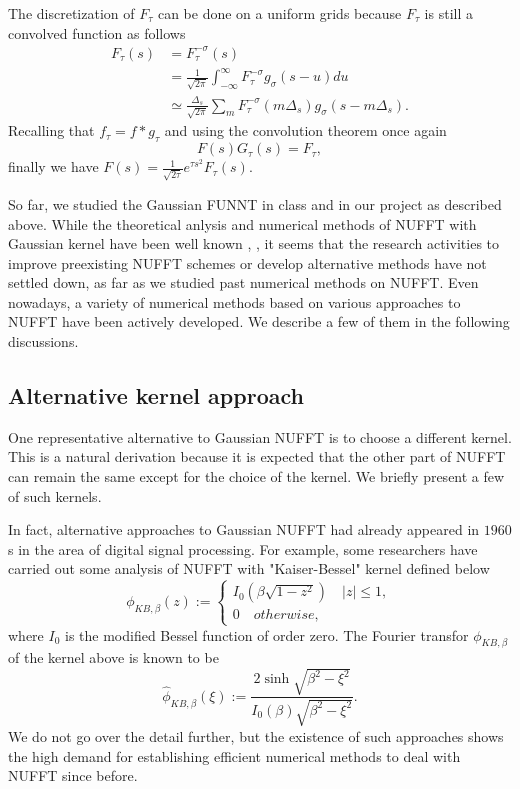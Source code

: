 The discretization of $F_{\tau}$ can be done on a uniform grids because $F_{\tau}$ is still a convolved function as follows
\begin{align}
     F_{\tau}(s) 
  &= F_{\tau}^{-\sigma}(s) \\
  &= \frac{1}{\sqrt{2\pi}}\int_{-\infty}^{\infty}F_{\tau}^{-\sigma}g_{\sigma}(s-u)du \\
  &\simeq \frac{\Delta_{s}}{\sqrt{2\pi}}\sum_{m}^{}F_{\tau}^{-\sigma}(m\Delta_{s})
          g_{\sigma}(s - m\Delta_{s}).
\end{align}
Recalling that $f_{\tau} = f\ast g_{\tau}$ and using the convolution theorem once again
\begin{equation}
  F(s)G_{\tau}(s) = F_{\tau},
\end{equation}
finally we have $F(s) = \frac{1}{\sqrt{2\tau}}e^{\tau s^2}F_{\tau}(s)$.

So far, we studied the Gaussian FUNNT in class and in our project as described above.
While the theoretical anlysis and numerical methods of NUFFT with Gaussian kernel have been well known \cite{SISC-1993-Dutt-Rokhlin}, \cite{SIAM-Rev-2004-Greengard}, it seems that the research activities to improve preexisting NUFFT schemes or develop alternative methods have not settled down, as far as we studied past numerical methods on NUFFT.
Even nowadays, a variety of numerical methods based on various approaches to NUFFT have been actively developed.
We describe a few of them in the following discussions.

\subsection{Alternative kernel approach}
One representative alternative to Gaussian NUFFT is to choose a different kernel.
This is a natural derivation because it is expected that the other part of NUFFT can remain the same except for the choice of the kernel.
We briefly present a few of such kernels.

In fact, alternative approaches to Gaussian NUFFT had already appeared in $1960$s in the area of digital signal processing.
For example, some researchers have carried out some analysis of NUFFT with "Kaiser-Bessel" kernel \cite{Book-Kaiser} defined below
\begin{equation}
  \phi_{KB,\beta}(z) := 
  \begin{cases}
    I_{0}\left(\beta\sqrt{1-z^2}\right) \quad |z| \le 1,\\
    0 \quad otherwise,
  \end{cases}
  \label{eq:KB-kernel}
\end{equation}
where $I_{0}$ is the modified Bessel function of order zero.
The Fourier transfor $\phi_{KB,\beta}$ of the kernel above is known to be 
\begin{equation}
  \hat{\phi}_{KB,\beta}(\xi) := 
  \frac{2\sinh\sqrt{\beta^2-\xi^2}}{I_{0}(\beta)\sqrt{\beta^2-\xi^2}}.
  \label{eq:FT-KB-kernel}
\end{equation} 
We do not go over the detail further, but the existence of such approaches shows the high demand for establishing efficient numerical methods to deal with NUFFT since before.

